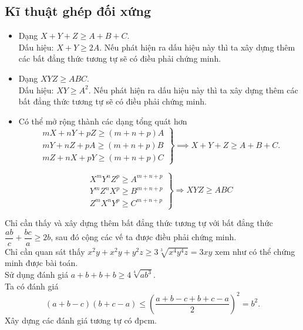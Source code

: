 \subsection{Kĩ thuật ghép đối xứng}
\begin{itemize}
\item Dạng $X+Y+Z\ge A+B+C$.\\
Dấu hiệu: $X+Y\ge 2A$. Nếu phát hiện ra dấu hiệu này thì ta xây dựng thêm các bất đẳng thức tương tự sẽ có điều phải chứng minh.
\item Dạng $XYZ\ge ABC$.\\
Dấu hiệu: $XY\ge A^2$. Nếu phát hiện ra dấu hiệu này thì ta xây dựng thêm các bất đẳng thức tương tự sẽ có điều phải chứng minh.
\item Có thể mở rộng thành các dạng tổng quát hơn
$$\left.\begin{array}{l}
mX+nY+pZ\ge \left( m+n+p \right)A \\ 
mY+nZ+pA\ge \left( m+n+p \right)B \\ 
mZ+nX+pY\ge \left( m+n+p \right)C 
\end{array}\right\}\implies X+Y+Z\ge A+B+C.$$

$$\left. \begin{array}{l}
{{X}^{m}}{{Y}^{n}}{{Z}^{p}}\ge {{A}^{m+n+p}} \\ 
{{Y}^{m}}{{Z}^{n}}{{X}^{p}}\ge {{B}^{m+n+p}} \\ 
{{Z}^{m}}{{X}^{n}}{{Y}^{p}}\ge {{C}^{m+n+p}}
\end{array} \right\}\Rightarrow XYZ\ge ABC$$

\end{itemize}
\hda  Chỉ cần thấy và xây dựng thêm bất đẳng thức tương tự với bất đẳng thức $\dfrac{ab}{c}+\dfrac{bc}{a}\ge 2b$, sau đó cộng các vế ta được điều phải chứng minh.\\
\hda  Chỉ cần quan sát thấy ${{x}^{2}}y+{{x}^{2}}y+{{y}^{2}}z\ge 3\sqrt[3]{{{x}^{4}}{{y}^{4}}z}=3xy$ xem như có thể chứng minh được bài toán.\\
\hda  Sử dụng đánh giá $a+b+b+b\ge 4\sqrt[4]{a{{b}^{3}}}$.\\
\hda  Ta có đánh giá \[\left( a+b-c \right)\left( b+c-a \right)\le {{\left( \frac{a+b-c+b+c-a}{2} \right)}^{2}}={{b}^{2}}.\] Xây dựng các đánh giá tương tự có đpcm.\\
